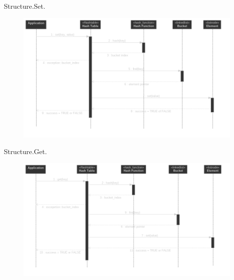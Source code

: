 \documentclass{beamer}
\begin{document}
\begin{frame}{Structure.}{Set.}
  \begin{figure}
    \includegraphics[scale=0.3]{pictures/structure_set_sequence}
  \end{figure}
\end{frame}

\begin{frame}{Structure.}{Get.}
  \begin{figure}
    \includegraphics[scale=0.3]{pictures/structure_get_sequence}
  \end{figure}
\end{frame}
\end{document}
